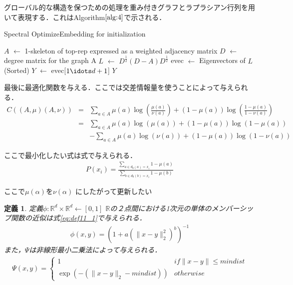 \documentclass{jsarticle}
\newtheorem{dfn}{定義}
\begin{document}
グローバル的な構造を保つための処理を重み付きグラフとラプラシアン行列を用いて表現する．これはAlgorithm$\ref{alg:4}$で示される．
\begin{algorithm}
  \caption{Spectral OptimizeEmbedding for initialization}
  \label{alg:4}
  \begin{algorithmic}
    \State $A$ $\leftarrow$ 1-skeleton of top-rep expressed as a weighted adjacency matrix
    \State $D$ $\leftarrow$ degree matrix for the graph A
    \State $L$ $\leftarrow$ $D^\frac{1}{2}(D-A)D^\frac{1}{2}$
    \State evec $\leftarrow$ Eigenvectors of $L$ (Sorted)
    \State $Y$ $\leftarrow$ evec[$1 \idots d+1$]
    \State \Return $Y$
  \end{algorithmic}
\end{algorithm}

最後に最適化関数を与える．ここでは交差情報量を使うことによって与えられる．
\begin{eqnarray}
  C((A,\mu)(A,\nu))&=&\sum_{a \in A} \mu (a) \log (\frac{\mu(a)}{\nu(a)}) + (1-\mu (a)) \log (\frac{1-\mu(a)}{1-\nu(a)}) \\
  &=&\sum_{a \in A} \mu (a) \log (\mu(a)) + (1-\mu (a)) \log (1-\mu(a)) \nonumber \\
  &&-\sum_{a \in A} \mu (a) \log (\nu(a)) + (1-\mu (a)) \log (1-\nu(a)) 
\end{eqnarray}

ここで最小化したい式は式で与えられる．
\begin{eqnarray}
P(x_i)=\frac{\sum_{a \in d_0(a)=x_i} 1 - \mu (a)}{\sum_{b \in d_0(b)=x_i} 1 - \mu (b)}
\end{eqnarray}

ここで$\mu(\alpha)$を$\nu(\alpha)$ にしたがって更新したい

\begin{dfn}
定義$\phi:\mathbb{R}^d\times\mathbb{R}^d \leftarrow [0,1]$
$\mathbb{R}$の２点間における1次元の単体のメンバーシップ関数の近似は式\ref{eq:def11_1}で与えられる．
\begin{eqnarray}
  \label{eq:def11_1}
  \phi(x,y)=(1+a(\|x-y\|_2^2)^b)^{-1}
\end{eqnarray}
また，$\Psi$は非線形最小二乗法によって与えられる．
\begin{eqnarray}
  \Psi(x , y)= \left\{ \begin{array}{ll}
    1  & if\| x-y\| \leq mindist \\
    \exp(-(\| x-y \|_2 - {mindist})) & otherwise
  \end{array} \right.
\end{eqnarray}

\end{dfn}
\end{document}
